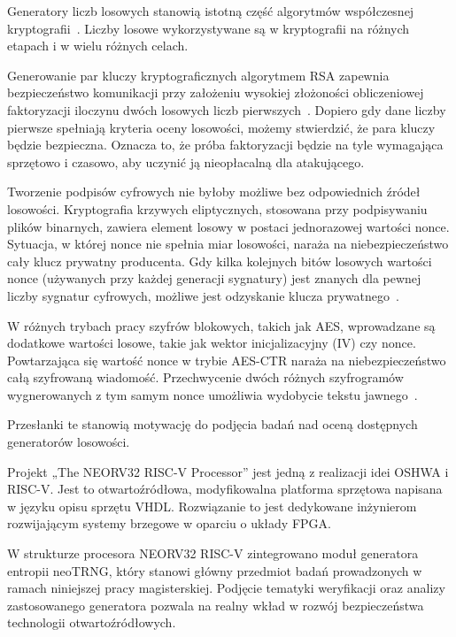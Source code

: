 Generatory liczb losowych stanowią istotną część algorytmów 
współczesnej kryptografii~\cite{2016Sreekumar-Ramesh}. Liczby losowe 
wykorzystywane są w kryptografii na różnych etapach i w wielu 
różnych celach.

Generowanie par kluczy kryptograficznych algorytmem RSA zapewnia bezpieczeństwo 
komunikacji przy założeniu wysokiej złożoności obliczeniowej faktoryzacji iloczynu 
dwóch losowych liczb pierwszych~\cite{Handbook-of-Applied-Cryptography}. 
Dopiero gdy dane liczby pierwsze spełniają kryteria oceny losowości, możemy 
stwierdzić, że para kluczy będzie bezpieczna. Oznacza to, że próba 
faktoryzacji będzie na tyle wymagająca sprzętowo i czasowo, aby uczynić ją 
nieopłacalną dla atakującego.

Tworzenie podpisów cyfrowych nie byłoby możliwe bez odpowiednich źródeł 
losowości. Kryptografia krzywych eliptycznych, stosowana przy podpisywaniu 
plików binarnych, zawiera element losowy w postaci jednorazowej wartości nonce. 
Sytuacja, w której nonce nie spełnia miar losowości, naraża na niebezpieczeństwo 
cały klucz prywatny producenta. Gdy kilka kolejnych bitów losowych wartości nonce 
(używanych przy każdej generacji sygnatury) jest znanych dla pewnej liczby 
sygnatur cyfrowych, możliwe jest odzyskanie klucza 
prywatnego~\cite{ch1-the-insecurity-of-ECDSA}.

W różnych trybach pracy szyfrów blokowych, takich jak AES, wprowadzane są 
dodatkowe wartości losowe, takie jak wektor inicjalizacyjny (IV) czy nonce. Powtarzająca się 
wartość nonce w trybie AES-CTR naraża na niebezpieczeństwo całą szyfrowaną wiadomość. 
Przechwycenie dwóch różnych szyfrogramów wygnerowanych z tym samym nonce 
umożliwia wydobycie tekstu jawnego~\cite{NIST-SP-800-38A}.

Przesłanki te stanowią motywację do podjęcia badań nad oceną dostępnych 
generatorów losowości.

Projekt „The NEORV32 RISC-V Processor” jest jedną z realizacji idei OSHWA i 
RISC-V. Jest to otwartoźródłowa, modyfikowalna platforma sprzętowa napisana w 
języku opisu sprzętu VHDL. Rozwiązanie to jest dedykowane inżynierom rozwijającym 
systemy brzegowe w oparciu o układy FPGA.

W strukturze procesora NEORV32 RISC-V zintegrowano moduł generatora entropii 
neoTRNG, który stanowi główny przedmiot badań prowadzonych w ramach niniejszej 
pracy magisterskiej. Podjęcie tematyki weryfikacji oraz analizy zastosowanego 
generatora pozwala na realny wkład w rozwój bezpieczeństwa 
technologii otwartoźródłowych.




